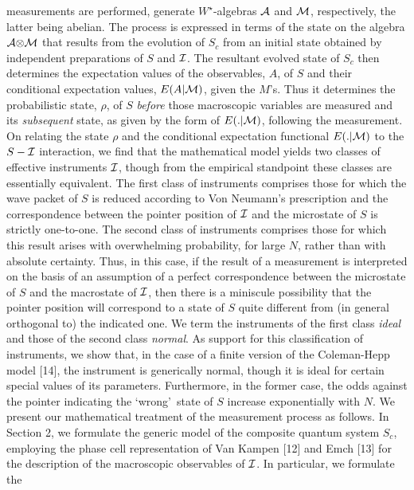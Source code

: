measurements are performed, generate $W^{\star}$-algebras ${\cal A}$ and ${\cal M}$, 
respectively, the latter being abelian. The process is expressed in terms of the state on the 
algebra ${\cal A}{\otimes}{\cal M}$ that results from the evolution of $S_{c}$ from an 
initial state obtained by independent preparations of $S$  and ${\cal I}$. The resultant 
evolved state of $S_{c}$ then determines the expectation values of the observables, $A$, 
of  $S$ and their conditional expectation values, $E(A{\vert}{\cal M})$, given the 
$M$\rq s. Thus it determines the probabilistic state, ${\rho}$, of $S$ {\it before} those 
macroscopic variables are  measured and its {\it subsequent} state, as given by the form 
of $E(.{\vert}{\cal M})$, following the measurement.
\vskip 0.2cm
On relating the state ${\rho}$ and the conditional expectation functional $E(.{\vert}{\cal 
M})$ to the $S-{\cal I}$ interaction, we find that the mathematical model yields two 
classes of effective instruments ${\cal I}$, though from the empirical standpoint these 
classes are essentially equivalent. The first class of instruments comprises those for 
which the wave packet of $S$ is reduced according to Von Neumann\rq s prescription 
and the correspondence between the pointer position of ${\cal I}$ and the microstate of 
$S$ is strictly one-to-one. The second class of instruments comprises those for which this 
result arises with overwhelming probability, for large $N$, rather than with absolute 
certainty. Thus, in this case, if the result of a measurement is interpreted on the basis of 
an assumption of a perfect correspondence between the microstate of $S$ and the 
macrostate of ${\cal I}$,  then there is a miniscule possibility that the pointer position 
will correspond to a state of $S$ quite different from (in general orthogonal to) the 
indicated one. We term the instruments of the first class {\it ideal} and those of the 
second class {\it normal}. As support for this classification of instruments, we show that, 
in the case of  a finite version of the Coleman-Hepp model [14], the instrument is 
generically normal, though it is ideal for certain special values of its parameters. 
Furthermore, in the former case, the odds against the pointer indicating the \lq wrong\rq\ 
state of $S$ increase exponentially with $N$.
\vskip 0.2cm
We present our mathematical treatment of the measurement process as follows. In 
Section 2, we formulate the generic model of the composite quantum system $S_{c}$, 
employing the phase cell representation of Van Kampen [12] and Emch [13] for the 
description of the macroscopic observables of ${\cal I}$.  In particular, we formulate the 
